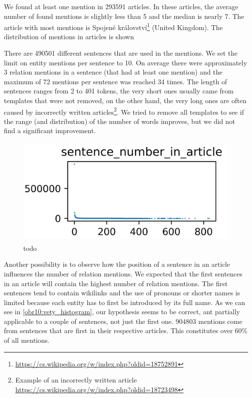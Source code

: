 We found at least one mention in 293591 articles. In these articles, the average number of found mentions is slightly less than 5 and the median is nearly 7. The article with most mentions is Spojené království\footnote{\url{https://cs.wikipedia.org/w/index.php?oldid=18752891}} (United Kingdom). The distribution of mentions in articles is shown 

There are 490501 different sentences that are used in the mentions. We set the limit on entity mentions per sentence to 10. On average there were approximately 3 relation mentions in a sentence (that had at least one mention) and the maximum of 72 mentions per sentence was reached 34 times. The length of sentences ranges from 2 to 401 tokens, the very short ones usually came from templates that were not removed, on the other hand, the very long ones are often caused by incorrectly written articles\footnote{Example of an incorrectly written article \url{https://cs.wikipedia.org/w/index.php?oldid=18723498}}. We tried to remove all templates to see if the range (and distribution) of the number of words improves, but we did not find a significant improvement.



\begin{figure}[h]\centering
\includegraphics[width=119mm, height=54mm]{./img/CERED0_sentence_number_histogram}
\caption{todo}
\label{obr10:vety_histogram}
\end{figure}


Another possibility is to observe how the position of a sentence in an article influences the number of relation mentions. We expected that the first sentences in an article will contain the highest number of relation mentions. The first sentences tend to contain wikilinks and the use of pronouns or shorter names is limited because each entity has to first be introduced by its full name. As we can see in \autoref{obr10:vety_histogram}, our hypothesis seems to be correct, ant partially applicable to a couple of sentences, not just the first one. 904803 mentions come from sentences that are first in their respective articles. This constitutes over 60\% of all mentions.





